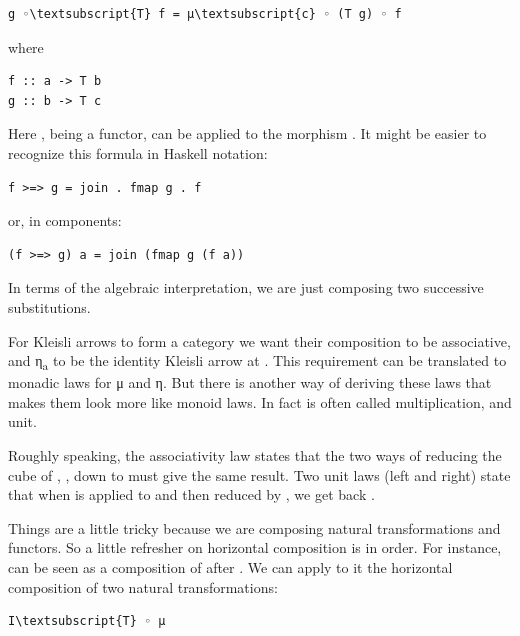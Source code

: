 \begin{Verbatim}[commandchars=\\\{\}]
g ◦\textsubscript{T} f = μ\textsubscript{c} ◦ (T g) ◦ f
\end{Verbatim}
where

\begin{Verbatim}[commandchars=\\\{\}]
f :: a -> T b
g :: b -> T c
\end{Verbatim}
Here , being a functor, can be applied to the morphism
. It might be easier to recognize this formula in Haskell
notation:

\begin{Verbatim}[commandchars=\\\{\}]
f >=> g = join . fmap g . f
\end{Verbatim}
or, in components:

\begin{Verbatim}[commandchars=\\\{\}]
(f >=> g) a = join (fmap g (f a))
\end{Verbatim}
In terms of the algebraic interpretation, we are just composing two
successive substitutions.

For Kleisli arrows to form a category we want their composition to be
associative, and η\textsubscript{a} to be the identity Kleisli arrow at
. This requirement can be translated to monadic laws for μ and
η. But there is another way of deriving these laws that makes them look
more like monoid laws. In fact  is often called
multiplication, and  unit.

Roughly speaking, the associativity law states that the two ways of
reducing the cube of , , down to  must
give the same result. Two unit laws (left and right) state that when
 is applied to  and then reduced by , we
get back .

Things are a little tricky because we are composing natural
transformations and functors. So a little refresher on horizontal
composition is in order. For instance,  can be seen as a
composition of  after . We can apply to it the
horizontal composition of two natural transformations:

\begin{Verbatim}[commandchars=\\\{\}]
I\textsubscript{T} ◦ μ
\end{Verbatim}

